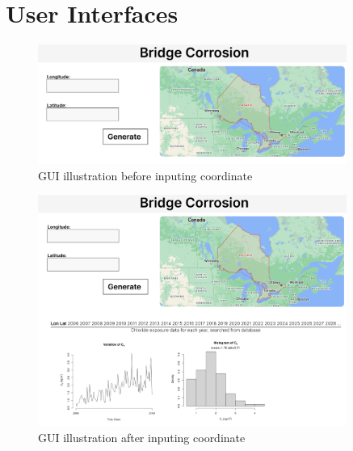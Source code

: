 \documentclass[12pt, titlepage]{article}
\begin{document}

\section{User Interfaces}

\begin{figure}[H]
\centering
\includegraphics[width=0.9\textwidth]{GUI1.png}
\caption{GUI illustration before inputing coordinate}
\label{FigGUI1}
\end{figure}

\begin{figure}[H]
\centering
\includegraphics[width=0.9\textwidth]{GUI2.png}
\caption{GUI illustration after inputing coordinate}
\label{FigGUI1}
\end{figure}
\end{document}
